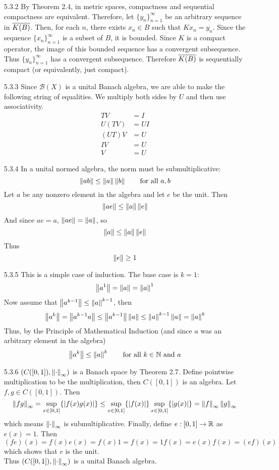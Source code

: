 \documentclass[../../Solutions.tex]{subfiles}
\begin{document}
\begin{itemize}
	\item [5.3.2] By Theorem 2.4, in metric spaces, compactness and sequential compactness are equivalent.
		Therefore, let $\{y_n\}_{n=1}^\infty$ be an arbitrary sequence in $\overline{K(B)}$.
		Then, for each $n$, there exists $x_n \in B$ such that $Kx_n = y_n$.
		Since the sequence $\{x_n\}_{n=1}^\infty$ is a subset of $B$, it is bounded.
		Since $K$ is a compact operator, the image of this bounded sequence has a convergent subsequence.
		Thus $\{y_n\}_{n=1}^\infty$ has a convergent subsequence.
		Therefore $\overline{K(B)}$ is sequentially compact (or equivalently, just compact).
	
	\item [5.3.3] Since $\mathcal{B}(X)$ is a unital Banach algebra, we are able to make the following string of equalities.
		We multiply both sides by $U$ and then use associativity.
		\begin{align*}
			TV &= I \\
			U(TV) &= UI \\
			(UT)V &= U \\
			IV &= U \\
			V &= U
		\end{align*}
	
	\item [5.3.4] In a unital normed algebra, the norm must be submultiplicative:
		$$ \left\lVert ab\right\rVert \leq \left\lVert a\right\rVert\left\lVert b\right\rVert \qquad\text{for all } a,b $$
		Let $a$ be any nonzero element in the algebra and let $e$ be the unit.
		Then
		$$ \left\lVert ae\right\rVert \leq \left\lVert a\right\rVert\left\lVert e\right\rVert $$
		And since $ae = a$, $\left\lVert ae\right\rVert = \left\lVert a\right\rVert$, so
		$$ \left\lVert a\right\rVert \leq \left\lVert a\right\rVert\left\lVert e\right\rVert $$
		Thus
		$$ \left\lVert e\right\rVert \geq 1 $$
	
	\item [5.3.5] This is a simple case of induction.
		The base case is $k=1$:
		$$ \left\lVert a^1\right\rVert = \left\lVert a\right\rVert = \left\lVert a\right\rVert^1 $$
		Now assume that $\left\lVert a^{k-1}\right\rVert \leq \left\lVert a\right\rVert^{k-1}$, then
		$$ \left\lVert a^k\right\rVert = \left\lVert a^{k-1}a\right\rVert \leq \left\lVert a^{k-1}\right\rVert\left\lVert a\right\rVert \leq \left\lVert a\right\rVert^{k-1}\left\lVert a\right\rVert = \left\lVert a\right\rVert^{k} $$
		Thus, by the Principle of Mathematical Induction (and since $a$ was an arbitrary element in the algebra)
		$$ \left\lVert a^k\right\rVert \leq \left\lVert a\right\rVert^k \qquad\text{for all } k\in\mathbb{N} \text{ and } a $$
	
	\item [5.3.6] $(C([0,1]),\left\lVert\cdot\right\rVert_\infty)$ is a Banach space by Theorem 2.7.
		Define pointwise multiplication to be the multiplication, then $C([0,1])$ is an algebra.
		Let $f,g \in C([0,1])$. Then
		$$ \left\lVert fg\right\rVert_\infty = \sup_{x\in[0,1]}\{|f(x)g(x)|\} \leq \sup_{x\in[0,1]}\{|f(x)|\}\sup_{x\in[0,1]}\{|g(x)|\} = \left\lVert f\right\rVert_\infty\left\lVert g\right\rVert_\infty $$
		which means $\left\lVert\cdot\right\rVert_\infty$ is submultiplicative.
		Finally, define $e:[0,1]\to\mathbb{R}$ as $e(x) = 1$. Then
		$$ (fe)(x) = f(x)e(x) = f(x)1 = f(x) = 1f(x) = e(x)f(x) = (ef)(x) $$
		which shows that $e$ is the unit. \\
		Thus $(C([0,1]),\left\lVert\cdot\right\rVert_\infty)$ is a unital Banach algebra.
	

\end{itemize}
\end{document}
